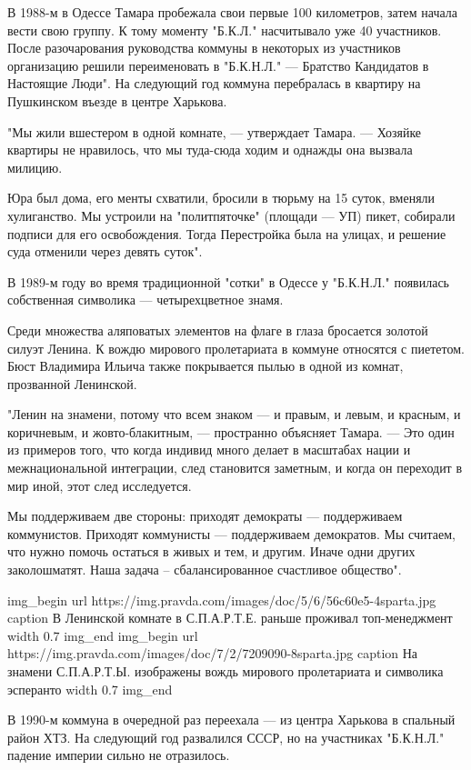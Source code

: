 В 1988-м в Одессе Тамара пробежала свои первые 100 километров, затем начала
вести свою группу. К тому моменту "Б.К.Л." насчитывало уже 40 участников. После
разочарования руководства коммуны в некоторых из участников организацию решили
переименовать в "Б.К.Н.Л." --- Братство Кандидатов в Настоящие Люди". На
следующий год коммуна перебралась в квартиру на Пушкинском въезде в центре
Харькова.

"Мы жили вшестером в одной комнате, --- утверждает Тамара. --- Хозяйке квартиры не
нравилось, что мы туда-сюда ходим и однажды она вызвала милицию. 

Юра был дома, его менты схватили, бросили в тюрьму на 15 суток, вменяли
хулиганство. Мы устроили на "политпяточке" (площади --- УП) пикет, собирали
подписи для его освобождения. Тогда Перестройка была на улицах, и решение суда
отменили через девять суток".

В 1989-м году во время традиционной "сотки" в Одессе у "Б.К.Н.Л." появилась
собственная символика --- четырехцветное знамя.

Среди множества аляповатых элементов на флаге в глаза бросается золотой силуэт
Ленина. К вождю мирового пролетариата в коммуне относятся с пиететом. Бюст
Владимира Ильича также покрывается пылью в одной из комнат, прозванной
Ленинской.

"Ленин на знамени, потому что всем знаком --- и правым, и левым, и красным, и
коричневым, и жовто-блакитным, --- пространно объясняет Тамара. --- Это один из
примеров того, что когда индивид много делает в масштабах нации и
межнациональной интеграции, след становится заметным, и когда он переходит в
мир иной, этот след исследуется. 

Мы поддерживаем две стороны: приходят демократы --- поддерживаем коммунистов.
Приходят коммунисты --- поддерживаем демократов. Мы считаем, что нужно помочь
остаться в живых и тем, и другим. Иначе одни других заколошматят. Наша задача –
сбалансированное счастливое общество".

\ifcmt
img_begin 
	url https://img.pravda.com/images/doc/5/6/56c60e5-4sparta.jpg
	caption В Ленинской комнате в С.П.А.Р.Т.Е. раньше проживал топ-менеджмент
	width 0.7
img_end
\fi
\ifcmt
img_begin 
	url https://img.pravda.com/images/doc/7/2/7209090-8sparta.jpg
	caption На знамени С.П.А.Р.Т.Ы. изображены вождь мирового пролетариата и символика
эсперанто
	width 0.7
img_end
\fi

В 1990-м коммуна в очередной раз переехала --- из центра Харькова в спальный
район ХТЗ. На следующий год развалился СССР, но на участниках "Б.К.Н.Л."
падение империи сильно не отразилось.

